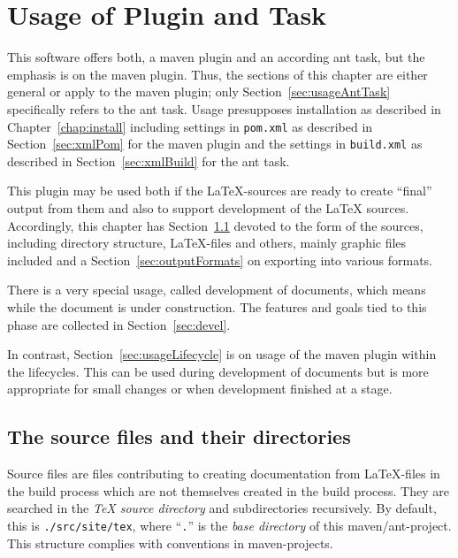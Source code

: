 
\chapter{Usage of Plugin and Task}\label{chap:usage}

This software offers both, a maven plugin and an according ant task,
but the emphasis is on the maven plugin.
Thus, the sections of this chapter are either general
or apply to the maven plugin;
only Section~\ref{sec:usageAntTask} specifically refers to the ant task. 
Usage presupposes installation as described in Chapter~\ref{chap:install}
including settings in \texttt{pom.xml} 
as described in Section~\ref{sec:xmlPom} for the maven plugin 
and the settings in \texttt{build.xml} 
as described in Section~\ref{sec:xmlBuild} for the ant task.

This plugin may be used both if the \LaTeX-sources are ready 
to create ``final'' output from them 
and also to support development of the \LaTeX{} sources. 
Accordingly, this chapter has Section~\ref{sec:sources}
devoted to the form of the sources, including directory structure,
\LaTeX-files and others, mainly graphic files included
and a Section~\ref{sec:outputFormats} on exporting into various formats.

There is a very special usage, called development of documents,
which means while the document is under construction.
The features and goals tied to this phase
are collected in Section~\ref{sec:devel}.

In contrast, Section~\ref{sec:usageLifecycle}
is on usage of the maven plugin within the lifecycles.
This can be used during development of documents
but is more appropriate for small changes
or when development finished at a stage. 


\section{The source files and their directories}\label{sec:sources}

Source files are files contributing to creating documentation 
from \LaTeX-files in the build process 
which are not themselves created in the build process. 
They are searched in the \emph{\TeX{} source directory} and subdirectories recursively. 
By default, this is \texttt{./src/site/tex}, 
where ``\texttt{.}'' is the \emph{base directory} of this maven/ant-project. 
This structure complies with conventions in maven-projects. 

